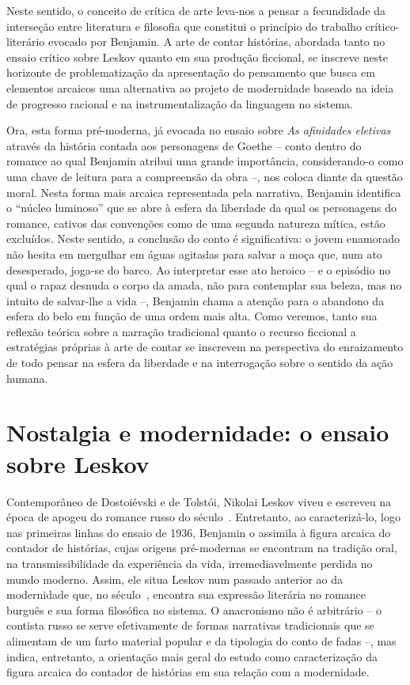 Neste sentido, o conceito de crítica de arte leva-nos a pensar a
fecundidade da interseção entre literatura e filosofia que constitui o
princípio do trabalho crítico-literário evocado por Benjamin. A arte de
contar histórias, abordada tanto no ensaio crítico sobre Leskov quanto
em sua produção ficcional, se inscreve neste horizonte de
problematização da apresentação do pensamento que busca em elementos
arcaicos uma alternativa ao projeto de modernidade baseado na ideia de
progresso racional e na instrumentalização da linguagem no sistema.

Ora, esta forma pré-moderna, já evocada no ensaio sobre \emph{As
afinidades eletivas} através da história contada aos personagens de
Goethe -- conto dentro do romance ao qual Benjamin atribui uma grande
importância, considerando-o como uma chave de leitura para a compreensão
da obra --, nos coloca diante da questão moral. Nesta forma mais arcaica
representada pela narrativa, Benjamin identifica o ``núcleo luminoso''
que se abre à esfera da liberdade da qual os personagens do romance,
cativos das convenções como de uma segunda natureza mítica, estão
excluídos. Neste sentido, a conclusão do conto é significativa: o jovem
enamorado não hesita em mergulhar em águas agitadas para salvar a moça
que, num ato desesperado, joga-se do barco. Ao interpretar esse ato
heroico -- e o episódio no qual o rapaz desnuda o corpo da amada, não
para contemplar sua beleza, mas no intuito de salvar-lhe a vida --,
Benjamin chama a atenção para o abandono da esfera do belo em função de
uma ordem mais alta. Como veremos, tanto sua reflexão teórica sobre a
narração tradicional quanto o recurso ficcional a estratégias próprias à
arte de contar se inscrevem na perspectiva do enraizamento de todo pensar
na esfera da liberdade e na interrogação sobre o sentido da ação humana.

\section{Nostalgia e modernidade: o ensaio sobre Leskov}

Contemporâneo de Dostoiévski e de Tolstói, Nikolai Leskov viveu e
escreveu na época de apogeu do romance russo do século~. Entretanto,
ao caracterizá-lo, logo nas primeiras linhas do ensaio de 1936, Benjamin
o assimila à figura arcaica do contador de histórias, cujas origens
pré-modernas se encontram na tradição oral, na transmissibilidade da
experiência da vida, irremediavelmente perdida no mundo moderno. Assim,
ele situa Leskov num passado anterior ao da modernidade que, no século~, 
encontra sua expressão literária no romance burguês e sua forma
filosófica no sistema. O anacronismo não é arbitrário -- o contista
russo se serve efetivamente de formas narrativas tradicionais que se
alimentam de um farto material popular e da tipologia do conto de fadas
--, mas indica, entretanto, a orientação mais geral do estudo como
caracterização da figura arcaica do contador de histórias em sua relação
com a modernidade.

